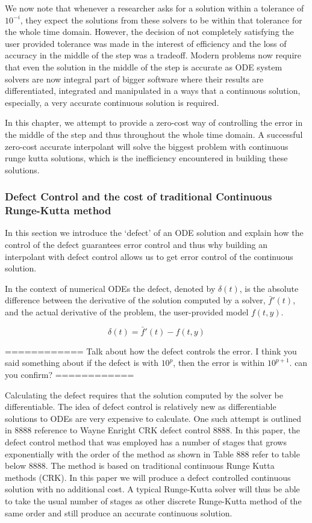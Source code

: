 \documentclass{article}
\begin{document}
We now note that whenever a researcher asks for a solution within a tolerance of $10^{-i}$, they expect the solutions from these solvers to be within that tolerance for the whole time domain. However, the decision of not completely satisfying the user provided tolerance was made in the interest of efficiency and the loss of accuracy in the middle of the step was a tradeoff. Modern problems now require that even the solution in the middle of the step is accurate as ODE system solvers are now integral part of bigger software where their results are differentiated, integrated and manipulated in a ways that a continuous solution, especially, a very accurate continuous solution is required. 

In this chapter, we attempt to provide a zero-cost way of controlling the error in the middle of the step and thus throughout the whole time domain. A successful zero-cost accurate interpolant will solve the biggest problem with continuous runge kutta solutions, which is the inefficiency encountered in building these solutions. 

\subsubsection{Defect Control and the cost of traditional Continuous Runge-Kutta method}
\label{section:crk_related_work}
In this section we introduce the `defect' of an ODE solution and explain how the control of the defect guarantees error control and thus why building an interpolant with defect control allows us to get error control of the continuous solution.

In the context of numerical ODEs the defect, denoted by $\delta(t)$,  is the absolute difference between the derivative of the solution computed by a solver, $\bar{f}'(t)$, and the actual derivative of the problem, the user-provided model $f(t, y)$. 

\begin{equation}
\delta(t) = \bar{f}'(t) - f(t, y)
\end{equation}

============
Talk about how the defect controls the error. I think you said something about if the defect is with $10^{p}$, then the error is within $10^{p+1}$. can you confirm?
============

Calculating the defect requires that the solution computed by the solver be differentiable. The idea of defect control is relatively new as differentiable solutions to ODEs are very expensive to calculate. One such attempt is outlined in 8888 reference to Wayne Enright CRK defect control 8888. In this paper, the defect control method that was employed has a number of stages that grows exponentially with the order of the method as shown in Table 888 refer to table below 8888. The method is based on traditional continuous Runge Kutta methods (CRK). In this paper we will produce a defect controlled continuous solution with no additional cost. A typical Runge-Kutta solver will thus be able to take the usual number of stages as other discrete Runge-Kutta method of the same order and still produce an accurate continuous solution.
\end{document}
